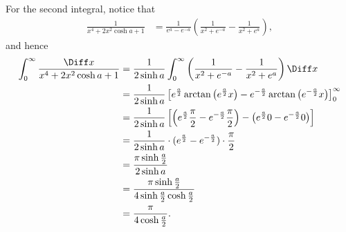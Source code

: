 \begin{enumerate}
          For the second integral, notice that
          \begin{align*}
              \frac{1}{x^4 + 2x^2 \cosh a + 1} & = \frac{1}{e^a - e^{-a}} \left(\frac{1}{x^2 + e^{-a}} - \frac{1}{x^2 + e^{a}}\right),
          \end{align*}
          and hence
          \begin{align*}
              \int_{0}^{\infty} \frac{\Diff x}{x^4 + 2x^2 \cosh a + 1} & = \frac{1}{2 \sinh a} \int_{0}^{\infty} \left(\frac{1}{x^2 + e^{-a}} - \frac{1}{x^2 + e^{a}}\right) \Diff x                                                          \\
                                                                       & = \frac{1}{2 \sinh a} \left[e^{\frac{a}{2}} \arctan \left(e^{\frac{a}{2}} x\right) - e^{-\frac{a}{2}} \arctan \left(e^{-\frac{a}{2}} x\right) \right]_{0}^{\infty}   \\
                                                                       & = \frac{1}{2 \sinh a} \left[\left(e^{\frac{a}{2}} \frac{\pi}{2} - e^{-\frac{a}{2}} \frac{\pi}{2}\right) - \left(e^{\frac{a}{2}} 0 - e^{-\frac{a}{2}} 0\right)\right] \\
                                                                       & = \frac{1}{2 \sinh a} \cdot (e^{\frac{a}{2}} - e^{-\frac{a}{2}}) \cdot \frac{\pi}{2}                                                                                 \\
                                                                       & = \frac{\pi \sinh \frac{a}{2}}{2 \sinh a}                                                                                                                            \\
                                                                       & = \frac{\pi \sinh \frac{a}{2}}{4 \sinh \frac{a}{2} \cosh \frac{a}{2}}                                                                                                \\
                                                                       & = \frac{\pi}{4 \cosh \frac{a}{2}}.
          \end{align*}
\end{enumerate}